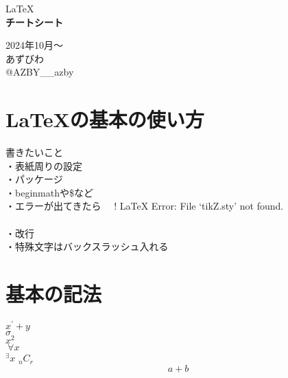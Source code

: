 \documentclass[11pt,a4j]{jreport}
\begin{document}

\thispagestyle{empty}
\begin{center}

\vspace{20mm}
{\Large\noindent LaTeX}\\
\vspace{40mm}
{\huge\noindent\textbf{チートシート}}\\
\medskip
\vspace{\baselineskip}
\vspace{30mm}

{\Large\noindent
2024年10月〜\\
\vspace{\baselineskip}
あずびわ\\
@AZBY__azby\\
}
\vspace{40mm}

\end{center}

\thispagestyle{empty}
\clearpage


\tableofcontents
\thispagestyle{fancy}
\pagestyle{fancy}
\lhead{\rightmark}
\renewcommand{\chaptermark}[1]{\markboth{第\ \normalfont\thechapter\ 章~~#1}{}}
\thispagestyle{fancy}
\chapter{LaTeXの基本の使い方}
書きたいこと\\
・表紙周りの設定\\
・パッケージ\\
・beginmathや\$など\\
・エラーが出てきたら　
! LaTeX Error: File `tikZ.sty' not found.\\
\\
・改行\\
・特殊文字はバックスラッシュ入れる\\

\chapter{基本の記法}
\thispagestyle{fancy}
$x^{\prime}+y$\\
$\sigma$\\
$x^{2}$\\
${}~{\forall}x$\\
${}^{\exists}x$
${}_{n}C_{r}$\\
\begin{equation}
a+b
\end{equation}
\end{document}
